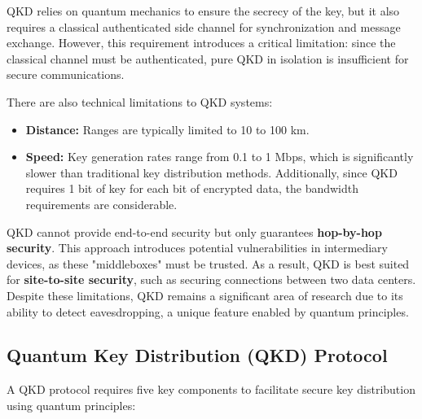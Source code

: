 QKD relies on quantum mechanics to ensure the secrecy of the key, but
it also requires a classical authenticated side channel for
synchronization and message exchange. However, this requirement
introduces a critical limitation: since the classical channel must be
authenticated, pure QKD in isolation is insufficient for secure
communications. 

There are also technical limitations to QKD systems: 
\begin{itemize}
  \item \textbf{Distance:} Ranges are typically limited to 10 to 100
    km.  
  \item \textbf{Speed:} Key generation rates range from 0.1 to 1 Mbps,
    which is significantly slower than traditional key distribution
    methods. Additionally, since QKD requires 1 bit of key for each
    bit of encrypted data, the bandwidth requirements are
    considerable.  
\end{itemize}

QKD cannot provide end-to-end security but only guarantees
\textbf{hop-by-hop security}. This approach introduces potential
vulnerabilities in intermediary devices, as these "middleboxes" must
be trusted. As a result, QKD is best suited for \textbf{site-to-site
security}, such as securing connections between two data centers.
Despite these limitations, QKD remains a significant area of research
due to its ability to detect eavesdropping, a unique feature enabled
by quantum principles.

\subsection{Quantum Key Distribution (QKD) Protocol}

A QKD protocol requires five key components to facilitate secure key
distribution using quantum principles:

